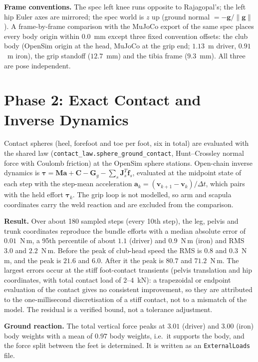 \documentclass[11pt,a4paper]{article}
\begin{document}
\textbf{Frame conventions.} The spec left knee runs opposite to Rajagopal's; the left hip Euler axes are mirrored; the spec world is $z$ up (ground normal $=-\mathbf{g}/\lVert\mathbf{g}\rVert$). A frame-by-frame comparison with the MuJoCo export of the same spec places every body origin within $0.0$~mm except three fixed convention offsets: the club body (OpenSim origin at the head, MuJoCo at the grip end; $1.13$~m driver, $0.91$~m iron), the grip standoff ($12.7$~mm) and the tibia frame ($9.3$~mm). All three are pose independent.

\section{Phase 2: Exact Contact and Inverse Dynamics}
Contact spheres (heel, forefoot and toe per foot, six in total) are evaluated with the shared law (\texttt{contact\_law.sphere\_ground\_contact}, Hunt--Crossley normal force with Coulomb friction) at the OpenSim sphere stations. Open-chain inverse dynamics is $\boldsymbol\tau=\mathbf{M}\mathbf{a}+\mathbf{C}-\mathbf{G}_g-\sum_s\mathbf{J}_s^{T}\mathbf{f}_s$, evaluated at the midpoint state of each step with the step-mean acceleration $\mathbf{a}_k=(\mathbf{v}_{k+1}-\mathbf{v}_k)/\Delta t$, which pairs with the held effort $\boldsymbol\tau_k$. The grip loop is not modelled, so arm and scapula coordinates carry the weld reaction and are excluded from the comparison.

\textbf{Result.} Over about 180 sampled steps (every 10th step), the leg, pelvis and trunk coordinates reproduce the bundle efforts with a median absolute error of $0.01$~N\,m, a 95th percentile of about $1.1$ (driver) and $0.9$~N\,m (iron) and RMS $3.0$ and $2.2$~N\,m. Before the peak of club-head speed the RMS is $0.8$ and $0.3$~N\,m, and the peak is $21.6$ and $6.0$. After it the peak is $80.7$ and $71.2$~N\,m. The largest errors occur at the stiff foot-contact transients (pelvis translation and hip coordinates, with total contact load of $2$--$4$~kN): a trapezoidal or endpoint evaluation of the contact gives no consistent improvement, so they are attributed to the one-millisecond discretisation of a stiff contact, not to a mismatch of the model. The residual is a verified bound, not a tolerance adjustment.

\textbf{Ground reaction.} The total vertical force peaks at $3.01$ (driver) and $3.00$ (iron) body weights with a mean of $0.97$ body weights, i.e.\ it supports the body, and the force split between the feet is determined. It is written as an \texttt{ExternalLoads} file.
\end{document}
